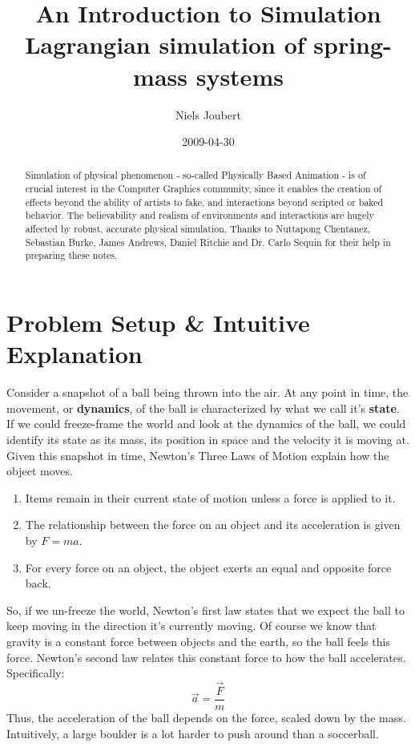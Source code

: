 \documentclass[]{article}
\title{An Introduction to Simulation \\
{\large Lagrangian simulation of spring-mass systems}}
\author{ Niels Joubert }
\date{2009-04-30}
\begin{document}
\ifpdf
{}
\else
{}
\fi

\maketitle

\begin{abstract}
Simulation of physical phenomenon - so-called Physically Based Animation - is of crucial interest in the Computer Graphics community, since it enables the creation of effects beyond the ability of artists to fake, and interactions beyond scripted or baked behavior. The believability and realism of environments and interactions are hugely affected by robust, accurate physical simulation. Thanks to Nuttapong Chentanez, Sebastian Burke, James Andrews, Daniel Ritchie and Dr. Carlo Sequin for their help in preparing these notes.
\end{abstract}

\tableofcontents

\pagebreak

\section{Problem Setup \& Intuitive Explanation}

Consider a snapshot of a ball being thrown into the air. At any point in time, the movement, or \textbf{dynamics}, of the ball is characterized by what we call it's \textbf{state}. If we could freeze-frame the world and look at the dynamics of the ball, we could identify its state as its mass, its position in space and the velocity it is moving at. Given this snapshot in time, Newton's Three Laws of Motion explain how the object moves.

\begin{enumerate}
	\item Items remain in their current state of motion unless a force is applied to it.
	\item The relationship between the force on an object and its acceleration is given by $F = ma$.
	\item For every force on an object, the object exerts an equal and opposite force back.
\end{enumerate}

So, if we un-freeze the world, Newton's first law states that we expect the ball to keep moving in the direction it's currently moving. Of course we know that gravity is a constant force between objects and the earth, so the ball feels this force. Newton's second law relates this constant force to how the ball accelerates. Specifically:
\begin{equation}
	\vec{a} = \frac{\vec{F}}{m}
\end{equation}
Thus, the acceleration of the ball depends on the force, scaled down by the mass. Intuitively, a large boulder is a lot harder to push around than a soccerball.
\end{document}
